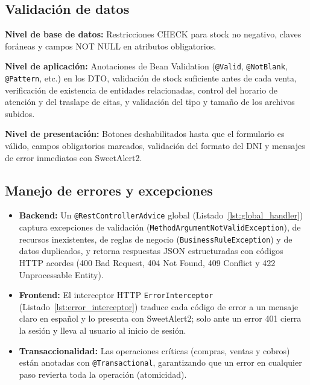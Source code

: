 \documentclass[11pt,a4paper]{report}
\newcommand{\codigoreal}[6]{%
  }
\begin{document}
\subsection{Validación de datos}
\textbf{Nivel de base de datos:} Restricciones CHECK para stock no negativo, claves foráneas y campos NOT NULL en atributos obligatorios.

\textbf{Nivel de aplicación:} Anotaciones de Bean Validation (\texttt{@Valid}, \texttt{@NotBlank}, \texttt{@Pattern}, etc.) en los DTO, validación de stock suficiente antes de cada venta, verificación de existencia de entidades relacionadas, control del horario de atención y del traslape de citas, y validación del tipo y tamaño de los archivos subidos.

\textbf{Nivel de presentación:} Botones deshabilitados hasta que el formulario es válido, campos obligatorios marcados, validación del formato del DNI y mensajes de error inmediatos con SweetAlert2.

\codigoreal{codigo/GlobalExceptionHandler.java}{25}{67}{Java}{Manejo centralizado de excepciones con @RestControllerAdvice (GlobalExceptionHandler.java)}{lst:global_handler}

\subsection{Manejo de errores y excepciones}
\begin{itemize}
\item \textbf{Backend:} Un \texttt{@RestControllerAdvice} global (Listado~\ref{lst:global_handler}) captura excepciones de validación (\texttt{MethodArgument\allowbreak NotValid\allowbreak Exception}), de recursos inexistentes, de reglas de negocio (\texttt{BusinessRule\allowbreak Exception}) y de datos duplicados, y retorna respuestas JSON estructuradas con códigos HTTP acordes (400 Bad Request, 404 Not Found, 409 Conflict y 422 Unprocessable Entity).
\item \textbf{Frontend:} El interceptor HTTP \texttt{ErrorInterceptor} (Listado~\ref{lst:error_interceptor}) traduce cada código de error a un mensaje claro en español y lo presenta con SweetAlert2; solo ante un error 401 cierra la sesión y lleva al usuario al inicio de sesión.
\item \textbf{Transaccionalidad:} Las operaciones críticas (compras, ventas y cobros) están anotadas con \texttt{@Transactional}, garantizando que un error en cualquier paso revierta toda la operación (atomicidad).
\end{itemize}
\end{document}
